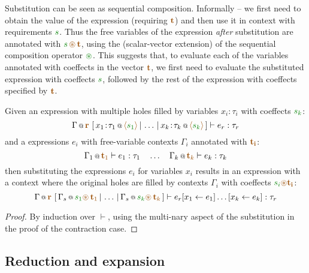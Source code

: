 Substitution can be seen as sequential composition. Informally -- we first need to obtain the 
value of the expression (requiring $\aclrd{\textbf{t}}$) and then use it in context with 
requirements $\cclrd{s}$. Thus the free variables of the expression \emph{after} substitution
are annotated with $\cclrd{s} \,\aseq\, \aclrd{\textbf{t}}$, using the (scalar-vector extension)
of the sequential composition operator $\cseq$. This suggests that, to evaluate each of the variables
annotated with coeffects in the vector $\aclrd{\textbf{t}}$, we first need to evaluate the substituted
expression with coeffects $\cclrd{s}$, followed by the rest of the expression with coeffects specified
by $\aclrd{\textbf{t}}$.

\begin{lemma}
\label{thm:structural-substitution}
Given an expression with multiple holes filled by variables $x_i\!:\!\tau_i$ with coeffects $\cclrd{s_k}$:
%
\begin{equation*}
\coctx{\Gamma}{\aclrd{\textbf{r}}}~[\,\coctx{x_1\!:\!\tau_1}{\alift{\cclrd{s_1}}} \,|\, \ldots \,|\,
  \coctx{x_k\!:\!\tau_k}{\alift{\cclrd{s_k}}}\,] \vdash e_r : \tau_r
\end{equation*}
%
and a expressions $e_i$ with free-variable contexts $\Gamma_i$ annotated with $\aclrd{\mathbf{t_i}}$:
%
\begin{equation*}
\coctx{\Gamma_1}{\aclrd{\textbf{t}_1}} \vdash e_1 : \tau_1 
\quad \ldots \quad
\coctx{\Gamma_k}{\aclrd{\textbf{t}_k}} \vdash e_k : \tau_k
\end{equation*}
%
then substituting the expressions $e_i$ for variables $x_i$ results in an expression with a context
where the original holes are filled by contexts $\Gamma_i$ with coeffects $\cclrd{s_i} \aseq \aclrd{\mathbf{t_i}}$:
%
\begin{equation*}
\coctx{\Gamma}{\aclrd{\textbf{r}}}~[\,\coctx{\Gamma_s}{\cclrd{s_1}\aseq\,\aclrd{\textbf{t}_1}} \,|\, \ldots \,|\, 
  \coctx{\Gamma_s}{\cclrd{s_k}\aseq\,\aclrd{\textbf{t}_k}}\,] \vdash \subst{\subst{e_r}{x_1}{e_1}\ldots}{x_k}{e_k} : \tau_r
\end{equation*}
\end{lemma}
\begin{proof}
By induction over $\vdash$, using the multi-nary aspect of the substitution 
in the proof of the contraction case.
\end{proof}

\subsection{Reduction and expansion}

